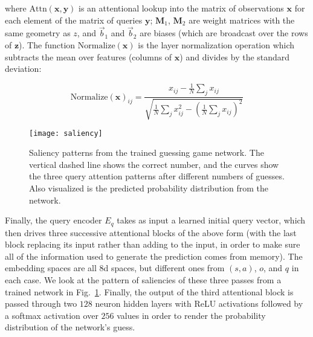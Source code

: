 \documentclass[letterpaper]{article}
\begin{document}
where $\textrm{Attn}(\textbf{x},\textbf{y})$ is an attentional lookup into the matrix of observations $\textbf{x}$ for each element of the matrix of queries $\textbf{y}$; $\textbf{M}_1$, $\textbf{M}_2$ are weight matrices with the same geometry as $z$, and $\vec{b}_1$ and $\vec{b}_2$ are biases (which are broadcast over the rows of $\textbf{z}$). The function $\textrm{Normalize}(\textbf{x})$ is the layer normalization \citep{ba2016layer} operation which subtracts the mean over features (columns of $\textbf{x}$) and divides by the standard deviation:

\begin{equation}
\textrm{Normalize}(\textbf{x})_{ij} = \frac{x_{ij} - \frac{1}{N} \sum_j x_{ij}}{\sqrt{\frac{1}{N} \sum_j x_{ij}^2 - (\frac{1}{N} \sum_j x_{ij})^2}}
\end{equation}

\begin{figure}
\texttt{[image: saliency]}
 \caption{\label{Saliency} Saliency patterns from the trained guessing game network. The vertical dashed line shows the correct number, and the curves show the three query attention patterns after different numbers of guesses. Also visualized is the predicted probability distribution from the network.}
\end{figure}

Finally, the query encoder $E_q$ takes as input a learned initial query vector, which then drives three successive attentional blocks of the above form (with the last block replacing its input rather than adding to the input, in order to make sure all of the information used to generate the prediction comes from memory). The embedding spaces are all $8$d spaces, but different ones from $(s,a)$, $o$, and $q$ in each case. We look at the pattern of saliencies of these three passes from a trained network in Fig.~\ref{Saliency}. Finally, the output of the third attentional block is passed through two $128$ neuron hidden layers with ReLU activations followed by a softmax activation over $256$ values in order to render the probability distribution of the network's guess.
\end{document}
